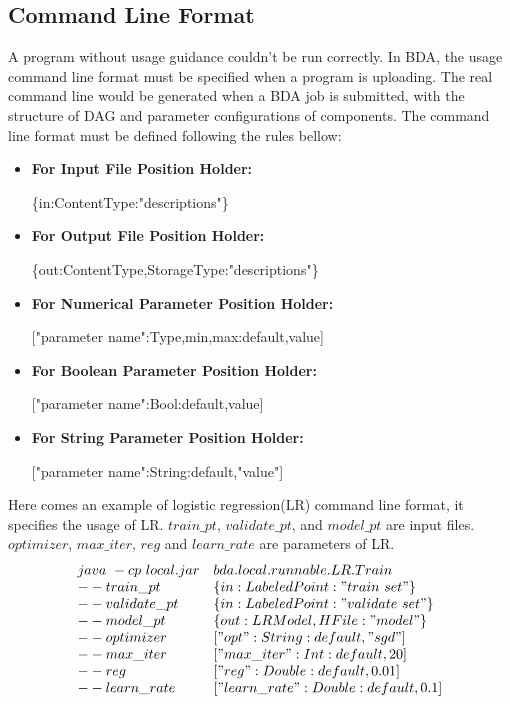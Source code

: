 \documentclass{sig-alternate-05-2015}
\begin{document}
\subsection{Command Line Format}
A program without usage guidance couldn't be run correctly. In BDA, the usage command line format must be specified when a program is uploading. The real command line would be generated when a BDA job is submitted, with the structure of DAG and parameter configurations of components. The command line format must be defined following the rules bellow:

\begin{itemize}
\item \textbf{For Input File Position Holder:}

 \{in:ContentType:"descriptions"\}
\item \textbf{For Output File Position Holder:}

\{out:ContentType,StorageType:"descriptions"\}
\item \textbf{For Numerical Parameter Position Holder:}

["parameter name":Type,min,max:default,value]
\item \textbf{For Boolean Parameter Position Holder:}

["parameter name":Bool:default,value]
\item \textbf{For String Parameter Position Holder:}

 ["parameter name":String:default,"value"]
\end{itemize}

Here comes an example of logistic regression(LR) command line format, it specifies the usage of LR. $train\_pt$, $validate\_pt$, and $model\_pt$ are input files. $optimizer$, $max\_iter$, $reg$ and $learn\_rate$ are parameters of LR.
$$
\begin{array}{ll}
java~-cp~local.jar & bda.local.runnable.LR.Train \\
--train\_pt & \{in:LabeledPoint:"train~set"\}\\
--validate\_pt & \{in:LabeledPoint:"validate~set"\}\\
--model\_pt & \{out:LRModel,HFile:"model"\}\\
--optimizer & ["opt":String:default,"sgd"]\\
--max\_iter & ["max\_iter":Int:default,20]\\
--reg & ["reg":Double:default,0.01]\\
--learn\_rate & ["learn\_rate":Double:default,0.1]
\end{array}
$$
\end{document}

